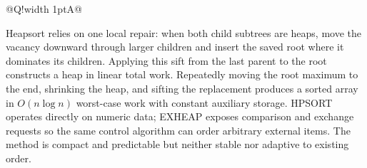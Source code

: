 \documentclass[10pt,letterpaper]{article}
\begin{document}
\begin{longtable}{@{}Q!{\color{Mist}\vrule width 1pt}A@{}}
\end{longtable}
\begin{tcolorbox}[colback=Ink!4,colframe=Ink,title=Cornell summary]
Heapsort relies on one local repair: when both child subtrees are heaps, move the vacancy downward through larger children and insert the saved root where it dominates its children. Applying this sift from the last parent to the root constructs a heap in linear total work. Repeatedly moving the root maximum to the end, shrinking the heap, and sifting the replacement produces a sorted array in $O(n\log n)$ worst-case work with constant auxiliary storage. HPSORT operates directly on numeric data; EXHEAP exposes comparison and exchange requests so the same control algorithm can order arbitrary external items. The method is compact and predictable but neither stable nor adaptive to existing order.
\end{tcolorbox}
\end{document}
